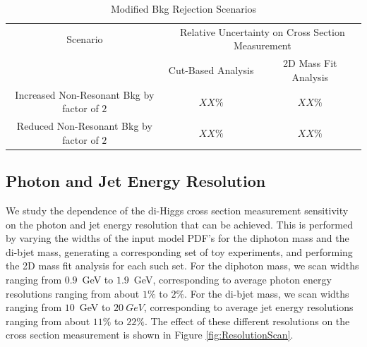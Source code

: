 \documentclass{cmspaper}
\begin{document}
\begin{table}[!ht]
\begin{center}
\begin{tabular}{|c|cc|}
\hline
Scenario                                       & \multicolumn{2}{|c|}{ Relative Uncertainty on Cross Section Measurement } \\ 
                                               & Cut-Based Analysis & 2D Mass Fit Analysis                                 \\ \hline
Increased Non-Resonant Bkg by factor of $2$    & $XX\%$             &   $XX\%$                                             \\
Reduced Non-Resonant Bkg by factor of $2$      & $XX\%$             &   $XX\%$                                             \\ 
\hline

\end{tabular}
\caption{Modified Bkg Rejection Scenarios}
\label{tab:ModifiedBkgRejectionScenarios}
\end{center}
\end{table}


\subsection{Photon and Jet Energy Resolution}
We study the dependence of the di-Higgs cross section measurement sensitivity on the
photon and jet energy resolution that can be achieved. This is performed by varying
the widths of the input model PDF's for the diphoton mass and the di-bjet mass,
generating a corresponding set of toy experiments, and performing the 2D mass fit analysis for each 
such set. For the diphoton mass, we scan widths ranging from $0.9$~GeV to $1.9$~GeV,
corresponding to average photon energy resolutions ranging from about $1\%$ to $2\%$.
For the di-bjet mass, we scan widths ranging from $10$~GeV to $20~GeV$, corresponding
to average jet energy resolutions ranging from about $11\%$ to $22\%$. The effect of
these different resolutions on the cross section measurement is shown 
in Figure \ref{fig:ResolutionScan}.
\end{document}

